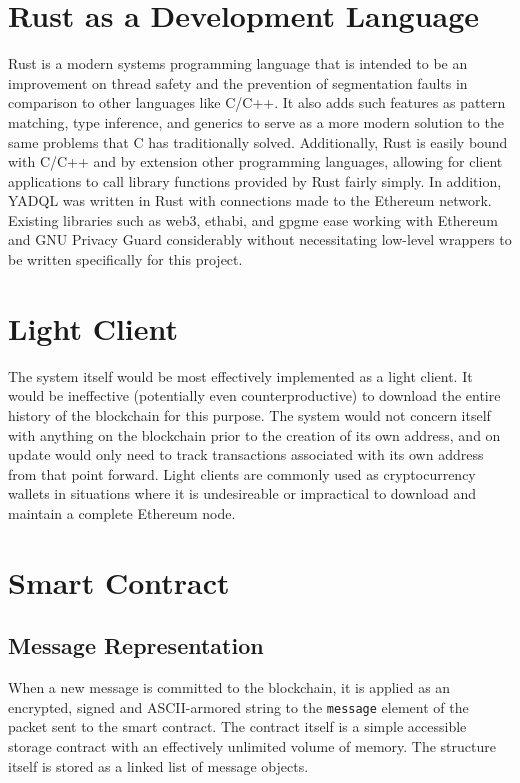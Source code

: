 \documentclass[]{article}
\begin{document}
\section{Rust as a Development Language}
Rust is a modern systems programming language that is intended to be an improvement on thread safety and the prevention of segmentation faults in comparison to other languages like C/C++. It also adds such features as pattern matching, type inference, and generics to serve as a more modern solution to the same problems that C has traditionally solved. Additionally, Rust is easily bound with C/C++ and by extension other programming languages, allowing for client applications to call library functions provided by Rust fairly simply. In addition, YADQL\cite{yadql} was written in Rust with connections made to the Ethereum network. Existing libraries such as web3\cite{web3}, ethabi\cite{ethabi}, and gpgme\cite{gpgme} ease working with Ethereum and GNU Privacy Guard considerably without necessitating low-level wrappers to be written specifically for this project\cite{rust}.

\section{Light Client}
The system itself would be most effectively implemented as a light client. It would be ineffective (potentially even counterproductive) to download the entire history of the blockchain for this purpose. The system would not concern itself with anything on the blockchain prior to the creation of its own address, and on update would only need to track transactions associated with its own address from that point forward. Light clients are commonly used as cryptocurrency wallets in situations where it is undesireable or impractical to download and maintain a complete Ethereum node.

\section{Smart Contract}
\subsection{Message Representation}
When a new message is committed to the blockchain, it is applied as an encrypted, signed and ASCII-armored string to the \verb!message! element of the packet sent to the smart contract. The contract itself is a simple accessible storage contract with an effectively unlimited volume of memory. The structure itself is stored as a linked list of message objects.
\end{document}
